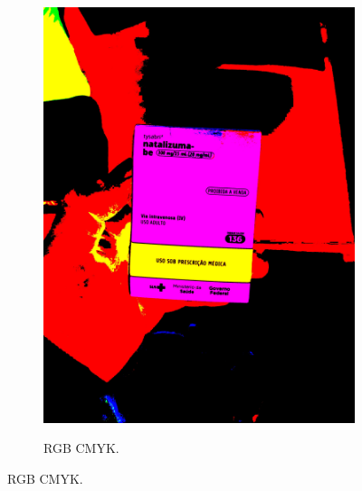 \begin{figure}[htb]
\begin{subfigure}[b]{0.21\textwidth}
        \includegraphics[width=\linewidth]{../pictures/tysabri_cmyk_thresh.jpg}
    \end{subfigure}
    \hfill
    \begin{subfigure}[b]{0.21\textwidth}
        \centering
        \caption{RGB CMYK.}
        \label{fig:foto:versoes:2:RGB_CMYK}

\end{subfigure}
\end{figure}
